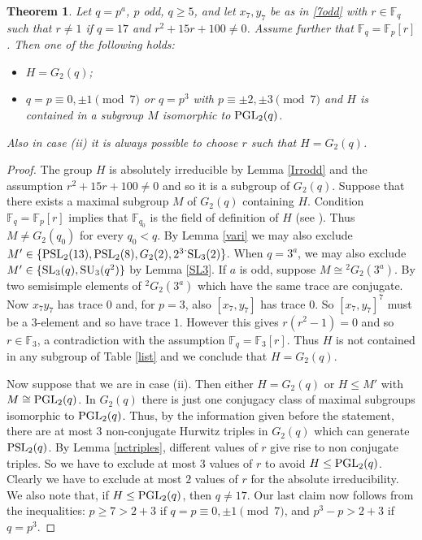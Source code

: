 \documentclass{amsart}
\newtheorem{theorem}[lemma]{Theorem}
\theoremstyle{remark}
\begin{document}
\begin{theorem}
Let $q=p^a$, $p$ odd, $q\ge 5$, and let $x_7,y_7$ be as in \eqref{7odd} with $r \in {\mathbb{F}}_q$
such that  $r\ne 1$ if $q=17$ and $r^2+15 r +100\neq 0$. Assume further that ${\mathbb{F}}_q={\mathbb{F}}_p[r]$.
Then one of the following holds:
\begin{itemize}
\item[(\rm{i})] $H=G_2(q)$;

\item[(\rm{ii})] $q=p\equiv 0,\pm 1 \pmod 7$ or  
$q=p^3$ with $p\equiv \pm 2, \pm 3\pmod 7$ and $H$ is contained in a subgroup $M$ isomorphic to ${\mathop{\rm PGL}\nolimits}_2(q)$.
\end{itemize}
Also in case {\rm (ii)} it is always possible to choose $r$ such that  
$H= G_2(q)$.
\end{theorem}

\begin{proof}
The group $H$ is absolutely irreducible by  Lemma \ref{Irrodd} and the assumption $r^2+15 r +100\neq 0$ and so it is a subgroup of $G_2(q)$. 
Suppose that there exists a maximal subgroup $M$ of $G_2(q)$ containing $H$.
Condition ${\mathbb{F}}_q={\mathbb{F}}_p[r]$ implies that ${\mathbb{F}}_{q_0}$ is the field of definition of $H$ (see \cite[Remark 6]{TV2}). Thus
$M\neq G_2(q_0)$ for every $q_0< q$. By Lemma \ref{vari} we may also exclude $M'\in \{{\mathop{\rm PSL}\nolimits}_2(13), {\mathop{\rm PSL}\nolimits}_2(8), G_2(2), 
{2^ 3}^.{\mathop{\rm SL}\nolimits}_3(2)\}$.
When $q=3^a$, we may also exclude $M'\in \{{\mathop{\rm SL}\nolimits}_3(q), {\mathop{\rm SU}\nolimits}_3(q^2)\}$ by Lemma \ref{SL3}. If $a$ is odd, suppose $M\cong {}^2G_2(3^a)$. 
By \cite[Proposition 3.14]{B} two semisimple elements of $^2G_2(3^a)$
which have the same trace are conjugate. Now $x_7y_7$ has trace $0$ and, for $p=3$,
also $[x_7,y_7]$ has trace $0$. So $[x_7,y_7]^ 7$ must be a $3$-element and so have trace $1$. 
However this gives $r(r^2-1)=0$ and so $r\in {\mathbb{F}}_3$, a contradiction with the assumption ${\mathbb{F}}_q={\mathbb{F}}_3[r]$.
Thus $H$ is not contained in 
any subgroup of  Table \ref{list} and we conclude  that $H=G_2(q)$.

Now suppose that we are in case (\rm{ii}). Then either $H=G_2(q)$ or $H\leq M'$ with $M\cong {\mathop{\rm PGL}\nolimits}_2(q)$. 
In $G_2(q)$ there is just one conjugacy class of maximal subgroups isomorphic to ${\mathop{\rm PGL}\nolimits}_2(q)$. Thus, by the information
given  before the statement,
there are at most $3$ non-conjugate
Hurwitz triples in $G_2(q)$ which can generate ${\mathop{\rm PSL}\nolimits}_2(q)$. By Lemma \ref{nctriples},
different values of $r$ give rise to non conjugate triples. So we have to exclude at most 3
values of $r$ to avoid $H\le {\mathop{\rm PGL}\nolimits}_2(q)$. Clearly we have to exclude at most $2$ values of $r$ for the absolute irreducibility.
We also note that, if $H\le {\mathop{\rm PGL}\nolimits}_2(q)$, then $q\ne 17$. Our last claim now follows from the inequalities:
$p\ge 7>2+3$ if $q=p\equiv 0,\pm 1 \pmod 7$, and  $p^3-p>2+3$  if $q=p^3$.
\end{proof}
\end{document}

